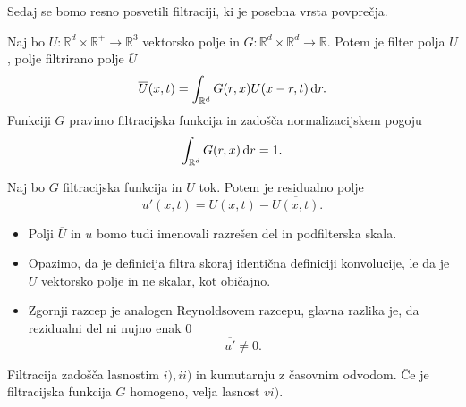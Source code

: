 \documentclass[mat2, tisk]{fmfdelo}
\newcommand{\R}{\mathbb R}
\begin{document}
Sedaj se bomo resno posvetili filtraciji, ki je posebna vrsta povprečja.
\begin{definicija}
Naj bo $U: \R^d\times \R^+ \rightarrow \R^3$ vektorsko polje in $G: \R^d\times \R^d \rightarrow \R$.
Potem je filter polja $U$, polje filtrirano polje $\overline{U}$
\begin{equation}
\overline{U}(x, t) = \int_{\R^d} G(r, x)U(x-r, t) \dif r.
\end{equation}
Funkciji $G$ pravimo filtracijska funkcija in zadošča normalizacijskem pogoju 
$$
\int_{\R^d} G(r, x) \dif r = 1.
$$
\end{definicija}

\begin{definicija}
Naj bo $G$ filtracijska funkcija in $U$ tok. Potem je residualno polje 
\begin{equation}
u'(x, t) = U(x, t) - \overline{U(x, t)}.
\end{equation}
\end{definicija}

\begin{opomba}
  \hfill
\begin{itemize}
\item Polji $\overline{U}$ in $u$ bomo tudi imenovali razrešen del in podfilterska skala.
\item Opazimo, da je definicija filtra skoraj identična definiciji konvolucije, le da je  
$U$ vektorsko polje in ne skalar, kot običajno.
\item Zgornji razcep je analogen Reynoldsovem razcepu, glavna razlika je, da rezidualni 
del ni nujno enak $0$
$$ \overline{u'} \neq 0.$$
\end{itemize}
\end{opomba}

\begin{trditev}
Filtracija zadošča lasnostim $i), ii)$ in kumutarnju z časovnim odvodom. Če je filtracijska funkcija $G$ homogeno, velja lasnost $vi)$.
\end{trditev}
\end{document}
